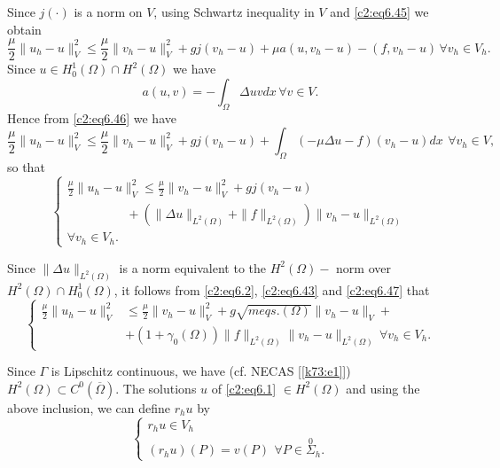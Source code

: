 Since $j(\cdot)$ is a norm on $V$, using Schwartz inequality in $V$
and \eqref{c2:eq6.45} we obtain 
{\fontsize{10}{12}\selectfont
\begin{equation}
\frac{\mu}{2}\parallel  u_h - u\parallel^2_V \leq \frac{\mu}{2}\parallel  v_h - u \parallel^2_V +
gj(v_h - u) + \mu a(u, v_h - u)- (f, v_h- u)\, \forall  v_h \in
V_h. \tag{6.46}\label{c2:eq6.46} 
\end{equation}}\relax
Since $u \in H^1_0 (\Omega) \cap H^2 (\Omega)$ we have
$$
a (u, v) = - \int_\Omega  \Delta u v dx\, \forall  v \in V.
$$
Hence from \eqref{c2:eq6.46} we have 
{\fontsize{10}{12}\selectfont
$$
\frac{\mu}{2} \parallel  u_h - u \parallel^2_V \leq \frac{\mu}{2}\parallel  v_h - u \parallel^2_V +
gj (v_h - u) + \int_\Omega (- \mu \Delta u - f) (v_h - u) dx ~\, \forall 
v_h \in V, 
$$}\relax
so that 
\begin{equation}
\begin{cases}
\frac{\mu}{2} \parallel  u_h - u \parallel^2_V \leq
\frac{\mu}{2}\parallel  v_h - u \parallel^2_V + 
gj (v_h - u) \\
\hspace{2cm}+(\parallel  \Delta u\parallel_{L^2 (\Omega)}+ \parallel f
\parallel_{L^2 (\Omega)}) \parallel  v_h - u \parallel_{L^2 (\Omega)}\\ 
\forall v_h \in V_h.
\end{cases}
\tag{6.47}\label{c2:eq6.47}
\end{equation}\pageoriginale 

Since $\parallel  \Delta u\parallel_{L^2 (\Omega)}$ is a norm equivalent to the $H^2
(\Omega)-$ norm over $H^2 (\Omega) \cap H^1_0 (\Omega)$, it follows
from \eqref{c2:eq6.2}, \eqref{c2:eq6.43} and \eqref{c2:eq6.47} that  
\begin{equation}
\begin{cases}
\frac{\mu}{2} \parallel  u_h - u \parallel^2_V & \leq \frac{\mu}{2}\parallel  v_h - u \parallel^2_V
+ g \sqrt{meqs. (\Omega)}\parallel  v_h - u \parallel_V +\\ 
& + (1 + \gamma_0 (\Omega)) \parallel  f\parallel_{L^2 (\Omega)} \parallel  v_h - u \parallel_{L^2
  (\Omega)}\, \forall  v_h \in V_h. 
\end{cases}
\tag{6.48}\label{c2:eq6.48}
\end{equation}

Since $\Gamma $ is Lipschitz continuous, we have (cf. NECAS [\ref{k73:e1}]) $H^2
(\Omega) \subset C^0 (\overline{\Omega})$. The solutions $u$ of \eqref{c2:eq6.1}
$\in H^2 (\Omega)$ and using the above inclusion, we can define
$r_h u$ by  
\begin{equation*}
\begin{cases}
r_h u \in V_h\\
(r_h u) (P) = v(P) ~\, \forall  P \in \overset{0}{\Sigma}_h.
\end{cases}
\end{equation*}

